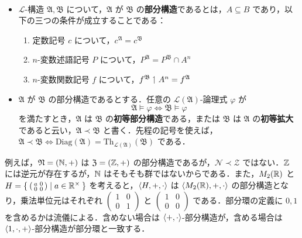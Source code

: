 \documentclass[a4j]{jsarticle}
\newcommand{\Diag}{\mathrm{Diag}}
\newcommand{\Th}{\mathrm{Th}}
\begin{document}
\begin{definition}
 　
 
 \begin{itemize}
  \item $\mathcal{L}$-構造 $\mathfrak{A}, \mathfrak{B}$ について，$\mathfrak{A}$ が $\mathfrak{B}$ の{\bfseries 部分構造}であるとは，$A \subseteq B$ であり，以下の三つの条件が成立することである：
	\begin{enumerate}
	 \item 定数記号 $c$ について，$c^\mathfrak{A} = c^\mathfrak{B}$
	 \item $n$-変数述語記号 $P$ について，$P^\mathfrak{A} = P^\mathfrak{B} \cap A^n$
	 \item $n$-変数関数記号 $f$ について，$f^\mathfrak{B} \upharpoonleft A^n = f^\mathfrak{A}$
	\end{enumerate}
  \item $\mathfrak{A}$ が $\mathfrak{B}$ の部分構造であるとする．任意の $\mathcal{L}(\mathfrak{A})$-論理式 $\varphi$ が
	\[
	 \mathfrak{A} \models \varphi \Longleftrightarrow \mathfrak{B} \models \varphi
	\]
	を満たすとき，$\mathfrak{A}$ は $\mathfrak{B}$ の{\bfseries 初等部分構造}である，または $\mathfrak{B}$ は $\mathfrak{A}$ の{\bfseries 初等拡大}であると云い，$\mathfrak{A} \prec \mathfrak{B}$ と書く．先程の記号を使えば，$\mathfrak{A} \prec \mathfrak{B} \Leftrightarrow \Diag(\mathfrak{A}) = \Th_{\mathcal{L}(\mathfrak{A})}(\mathfrak{B})$ である．
 \end{itemize}
\end{definition}

例えば，$\mathfrak{N} = (\mathbb{N}, +)$ は $\mathfrak{Z} = (\mathbb{Z}, +)$ の部分構造であるが，$\mathcal{N} \prec \mathcal{Z}$ ではない．$\mathbb{Z}$ には逆元が存在するが，$\mathbb{N}$ はそもそも群ではないからである．また，$M_2(\mathbb{R})$ と $H = \Set{ (\begin{smallmatrix}a & 0 \\ 0 & 0 \end{smallmatrix}) | a \in \mathbb{R}^\times}$ を考えると，$\braket{H, +, \cdot}$ は $\braket{M_2(\mathbb{R}), +, \cdot}$ の部分構造となり，乗法単位元はそれぞれ $(\begin{smallmatrix}1&0 \\ 0&1\end{smallmatrix})$ と $(\begin{smallmatrix}1&0 \\ 0&0\end{smallmatrix})$ である．部分環の定義に $0, 1$ を含めるかは流儀による．含めない場合は $\braket{+, \cdot}$-部分構造が，含める場合は $\braket{1, \cdot, +}$-部分構造が部分環と一致する．
\end{document}
